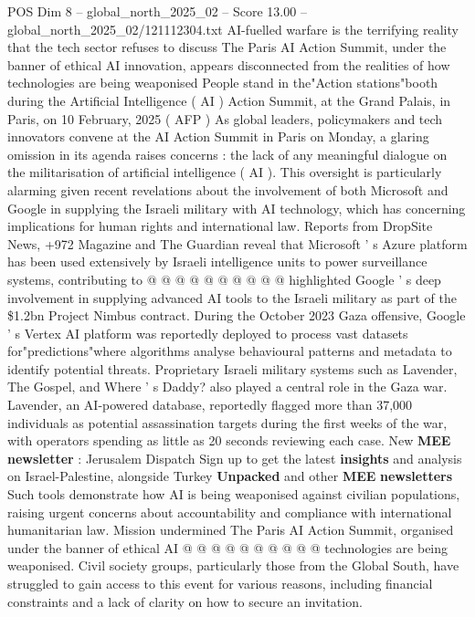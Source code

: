 \begin{textsample}{POS Dim 8 – global\_north\_2025\_02 – Score 13.00 – global\_north\_2025\_02/121112304.txt}  \label{ex:f8_pos_017}
AI-fuelled warfare is the terrifying reality that the tech sector refuses to discuss The Paris AI Action Summit, under the banner of ethical AI innovation, appears disconnected from the realities of how technologies are being weaponised People stand in the"Action stations"booth during the Artificial Intelligence ( AI ) Action Summit, at the Grand Palais, in Paris, on 10 February, 2025 ( AFP ) As global leaders, policymakers and tech innovators convene at the AI Action Summit in Paris on Monday, a glaring omission in its agenda raises concerns : the lack of any meaningful dialogue on the militarisation of artificial intelligence ( AI ).
This oversight is particularly alarming given recent revelations about the involvement of both Microsoft and Google in supplying the Israeli military with AI technology, which has concerning implications for human rights and international law.
Reports from DropSite News, +972 Magazine and The Guardian reveal that Microsoft ' s Azure platform has been used extensively by Israeli intelligence units to power surveillance systems, contributing to @ @ @ @ @ @ @ @ @ @ highlighted Google ' s deep involvement in supplying advanced AI tools to the Israeli military as part of the \$1.2bn Project Nimbus contract.
During the October 2023 Gaza offensive, Google ' s Vertex AI platform was reportedly deployed to process vast datasets for"predictions"where algorithms analyse behavioural patterns and metadata to identify potential threats.
Proprietary Israeli military systems such as Lavender, The Gospel, and Where ' s Daddy? also played a central role in the Gaza war.
Lavender, an AI-powered database, reportedly flagged more than 37,000 individuals as potential assassination targets during the first weeks of the war, with operators spending as little as 20 seconds reviewing each case.
New \textbf{MEE} \textbf{newsletter} : Jerusalem Dispatch Sign up to get the latest \textbf{insights} and analysis on Israel-Palestine, alongside Turkey \textbf{Unpacked} and other \textbf{MEE} \textbf{newsletters} Such tools demonstrate how AI is being weaponised against civilian populations, raising urgent concerns about accountability and compliance with international humanitarian law.
Mission undermined The Paris AI Action Summit, organised under the banner of ethical AI @ @ @ @ @ @ @ @ @ @ technologies are being weaponised.
Civil society groups, particularly those from the Global South, have struggled to gain access to this event for various reasons, including financial constraints and a lack of clarity on how to secure an invitation.

\end{textsample}
